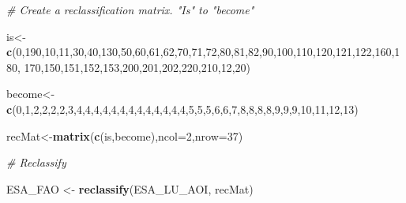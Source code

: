 \documentclass[
  10pt,
  b5paper,
]{book}
\newenvironment{Shaded}{\begin{snugshade}}{\end{snugshade}}
\newcommand{\CommentTok}[1]{\textcolor[rgb]{0.56,0.35,0.01}{\textit{#1}}}
\newcommand{\DataTypeTok}[1]{\textcolor[rgb]{0.13,0.29,0.53}{#1}}
\newcommand{\DecValTok}[1]{\textcolor[rgb]{0.00,0.00,0.81}{#1}}
\newcommand{\KeywordTok}[1]{\textcolor[rgb]{0.13,0.29,0.53}{\textbf{#1}}}
\newcommand{\NormalTok}[1]{#1}
\newcommand{\StringTok}[1]{\textcolor[rgb]{0.31,0.60,0.02}{#1}}
\begin{document}
\begin{Shaded}
\begin{Highlighting}[]
\CommentTok{# Create a reclassification matrix. "Is" to "become"}

\NormalTok{is<-}\KeywordTok{c}\NormalTok{(}\DecValTok{0}\NormalTok{,}\DecValTok{190}\NormalTok{,}\DecValTok{10}\NormalTok{,}\DecValTok{11}\NormalTok{,}\DecValTok{30}\NormalTok{,}\DecValTok{40}\NormalTok{,}\DecValTok{130}\NormalTok{,}\DecValTok{50}\NormalTok{,}\DecValTok{60}\NormalTok{,}\DecValTok{61}\NormalTok{,}\DecValTok{62}\NormalTok{,}\DecValTok{70}\NormalTok{,}\DecValTok{71}\NormalTok{,}\DecValTok{72}\NormalTok{,}\DecValTok{80}\NormalTok{,}\DecValTok{81}\NormalTok{,}\DecValTok{82}\NormalTok{,}\DecValTok{90}\NormalTok{,}\DecValTok{100}\NormalTok{,}\DecValTok{110}\NormalTok{,}\DecValTok{120}\NormalTok{,}\DecValTok{121}\NormalTok{,}\DecValTok{122}\NormalTok{,}\DecValTok{160}\NormalTok{,}\DecValTok{180}\NormalTok{,}
\DecValTok{170}\NormalTok{,}\DecValTok{150}\NormalTok{,}\DecValTok{151}\NormalTok{,}\DecValTok{152}\NormalTok{,}\DecValTok{153}\NormalTok{,}\DecValTok{200}\NormalTok{,}\DecValTok{201}\NormalTok{,}\DecValTok{202}\NormalTok{,}\DecValTok{220}\NormalTok{,}\DecValTok{210}\NormalTok{,}\DecValTok{12}\NormalTok{,}\DecValTok{20}\NormalTok{)}

\NormalTok{become<-}\KeywordTok{c}\NormalTok{(}\DecValTok{0}\NormalTok{,}\DecValTok{1}\NormalTok{,}\DecValTok{2}\NormalTok{,}\DecValTok{2}\NormalTok{,}\DecValTok{2}\NormalTok{,}\DecValTok{2}\NormalTok{,}\DecValTok{3}\NormalTok{,}\DecValTok{4}\NormalTok{,}\DecValTok{4}\NormalTok{,}\DecValTok{4}\NormalTok{,}\DecValTok{4}\NormalTok{,}\DecValTok{4}\NormalTok{,}\DecValTok{4}\NormalTok{,}\DecValTok{4}\NormalTok{,}\DecValTok{4}\NormalTok{,}\DecValTok{4}\NormalTok{,}\DecValTok{4}\NormalTok{,}\DecValTok{4}\NormalTok{,}\DecValTok{4}\NormalTok{,}\DecValTok{4}\NormalTok{,}\DecValTok{5}\NormalTok{,}\DecValTok{5}\NormalTok{,}\DecValTok{5}\NormalTok{,}\DecValTok{6}\NormalTok{,}\DecValTok{6}\NormalTok{,}\DecValTok{7}\NormalTok{,}\DecValTok{8}\NormalTok{,}\DecValTok{8}\NormalTok{,}\DecValTok{8}\NormalTok{,}\DecValTok{8}\NormalTok{,}\DecValTok{9}\NormalTok{,}\DecValTok{9}\NormalTok{,}\DecValTok{9}\NormalTok{,}\DecValTok{10}\NormalTok{,}\DecValTok{11}\NormalTok{,}\DecValTok{12}\NormalTok{,}\DecValTok{13}\NormalTok{)}

\NormalTok{recMat<-}\KeywordTok{matrix}\NormalTok{(}\KeywordTok{c}\NormalTok{(is,become),}\DataTypeTok{ncol=}\DecValTok{2}\NormalTok{,}\DataTypeTok{nrow=}\DecValTok{37}\NormalTok{)}

\CommentTok{# Reclassify}

\NormalTok{ESA_FAO <-}\StringTok{ }\KeywordTok{reclassify}\NormalTok{(ESA_LU_AOI, recMat)}


\end{Highlighting}
\end{Shaded}
\end{document}
